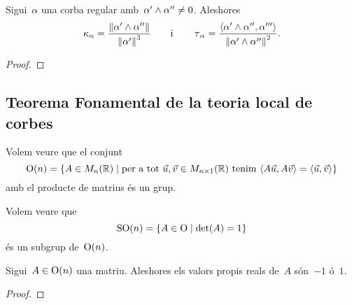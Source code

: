\documentclass[../../main.tex]{subfiles}
\begin{document}
    \begin{proposition}
        \label{prop:curvatura i torsió d'una corba regular}
        \label{prop:curvatura d'una corba regular}
        \label{prop:torsió d'una corba regular}
        Sigui~\(\alpha\) una corba regular amb~\(\alpha'\mathbin{\wedge}\alpha''\neq0\).
        Aleshores
        \[
            \curvatura_{\alpha}=\frac{\norm{\alpha'\prodvec\alpha''}}{\norm{\alpha'}^{3}}\qquad\text{i}\qquad\torsio_{\alpha}=\frac{\prodesc{\alpha'\prodvec\alpha''}{\alpha'''}}{\norm{\alpha'\prodvec\alpha''}^{2}}.
        \]
        \begin{proof}
        \end{proof}
    \end{proposition}
    \subsection{Teorema Fonamental de la teoria local de corbes}
    \begin{example}
        \label{ex:grup ortogonal}
        Volem veure que el conjunt
        \[
            \GrupOrtogonal(n)=\{A\in\matrius_{n}(\mathbb{R})\mid\text{per a tot }\vec{u},\vec{v}\in\matrius_{n\times1}(\mathbb{R})\text{ tenim }\prodesc{A\vec{u}}{A\vec{v}}=\prodesc{\vec{u}}{\vec{v}}\}
        \]
        amb el producte de matrius és un grup.
        \begin{solution}
        \end{solution}
    \end{example}
    \begin{example}
        \label{ex:grup especial ortogonal}
        Volem veure que
        \[
            \operatorname{SO}(n)=\{A\in\operatorname{O}\mid\det(A)=1\}
        \]
        és un subgrup de~\(\operatorname{O}(n)\).
        \begin{solution}
        \end{solution}
    \end{example}
    \begin{proposition}
        \label{prop:els valors propis d'una matriu ortogonal són -1 o 1}
        Sigui~\(A\in\operatorname{O}(n)\) una matriu.
        Aleshores els valors propis reals de~\(A\) són~\(-1\) ó~\(1\).
        \begin{proof}
        \end{proof}
    \end{proposition}
\end{document}
